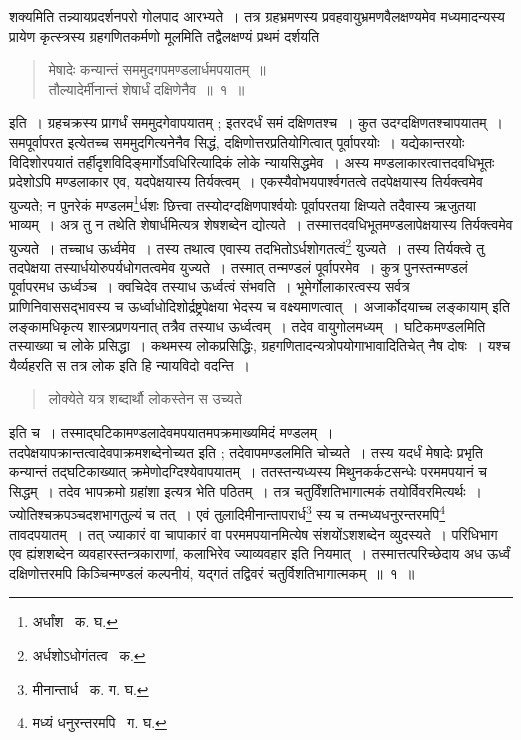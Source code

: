 \documentclass[11pt, openany]{book}
\begin{document}

\noindent शक्यमिति तन्न्यायप्रदर्शनपरो गोलपाद आरभ्यते~। तत्र ग्रहभ्रमणस्य प्रवहवायुभ्रमणवैलक्षण्यमेव मध्यमादन्यस्य प्रायेण कृत्स्त्रस्य ग्रहगणितकर्मणो मूलमिति तद्वैलक्षण्यं प्रथमं दर्शयति\textendash
\begin{quote}
{\ab मेषादेः कन्यान्तं सममुदगपमण्डलार्धमपयातम्~॥\\
तौल्यादेर्मीनान्तं शेषार्धं दक्षिणेनैव~॥~१~॥}
\end{quote}

इति~। ग्रहचक्रस्य प्रागर्धं सममुदगेवापयातम् ; इतरदर्धं समं दक्षिणतश्च~। कुत उदग्दक्षिणतश्चापयातम्~। समपूर्वापरत इत्येतच्च सममुदगित्यनेनैव सिद्धं, दक्षिणोत्तरप्रतियोगित्वात् पूर्वापरयोः~। यद्येकान्तरयोः विदिशोरपयातं तर्हीदृशविदिङ्मार्गोऽवधिरित्यादिकं लोके न्यायसिद्धमेव~। अस्य 
मण्डलाकारत्वात्तदवधिभूतः प्रदेशोऽपि मण्डलाकार एव, यदपेक्षयास्य तिर्यक्त्वम्~। एकस्यैवोभयपार्श्वगतत्वे तदपेक्षयास्य तिर्यक्त्वमेव युज्यते; न पुनरेकं मण्डलम\renewcommand{\thefootnote}{१}\footnote{अर्धांश \textendash\ क. घ.}र्धशः छित्त्वा 
तस्योदग्दक्षिणपार्श्वयोः पूर्वापरतया क्षिप्यते तदैवास्य ऋजुतया भाव्यम्~। अत्र तु न तथेति शेषार्धमित्यत्र शेषशब्देन द्योत्यते~। तस्मात्तदवधिभूतमण्डलापेक्षयास्य तिर्यक्त्वमेव युज्यते~। तच्चाध ऊर्ध्वमेव~। तस्य तथात्व एवास्य तदभितोऽर्धशोगतत्वं\renewcommand{\thefootnote}{२}\footnote{अर्धशोऽधोगंतत्व \textendash\ क.}
युज्यते~। तस्य तिर्यक्त्वे तु तदपेक्षया तस्यार्धयोरुपर्यधोगतत्वमेव युज्यते~। तस्मात् तन्मण्डलं पूर्वापरमेव~। कुत्र पुनस्तन्मण्डलं पूर्वापरमध ऊर्ध्वञ्च~। क्वचिदेव तस्याध ऊर्ध्वत्वं संभवति~। भूमेर्गोलाकारत्वस्य सर्वत्र प्राणिनिवाससद्भावस्य च ऊर्ध्वाधोदिशोर्द्रष्ट्रपेक्षया भेदस्य च
वक्ष्यमाणत्वात्~। {\qt अजार्कोदयाच्च लङ्कायाम्} इति लङ्कामधिकृत्य शास्त्रप्रणयनात् तत्रैव तस्याध ऊर्ध्वत्वम्~। तदेव वायुगोलमध्यम्~। घटिकमण्डलमिति तस्याख्या च लोके प्रसिद्धा~। कथमस्य लोकप्रसिद्धिः, ग्रहगणितादन्यत्रोपयोगाभावादितिचेत् नैष दोषः~। यश्च यैर्व्यहरति स तत्र लोक इति हि न्यायविदो वदन्ति~। 

\newpage 

\begin{quote}
{\qt लोक्येते यत्र शब्दार्थौ लोकस्तेन स उच्यते}
\end{quote} 

\indent इति च~। तस्माद्घटिकामण्डलादेवमपयातमपक्रमाख्यमिदं मण्डलम्~। तदपेक्षयापक्रान्तत्वादेवपाक्रमशब्देनोच्यत इति ; तदेवापमण्डलमिति चोच्यते~। तस्य यदर्धं मेषादेः प्रभृति कन्यान्तं तद्घटिकाख्यात् क्रमेणोदग्दिश्येवापयातम्~। ततस्तन्यध्यस्य मिथुनकर्कटसन्धेः परममपयानं च सिद्धम्~। तदेव {\qt भापक्रमो ग्रहांशा} इत्यत्र भेति पठितम्~। तत्र चतुर्विंशतिभागात्मकं तयोर्विवरमित्यर्थः~। ज्योतिश्चक्रपञ्चदशभागतुल्यं च तत्~। एवं तुलादिमीनान्तापरार्ध\renewcommand{\thefootnote}{१}\footnote{मीनान्तार्ध \textendash\ क. ग. घ.} स्य च तन्मध्यधनुरन्तरमपि\renewcommand{\thefootnote}{२}\footnote{मध्यं धनुरन्तरमपि \textendash\ ग. घ.} तावदपयातम्~। तत् ज्याकारं वा चापाकारं वा परममपयानमित्येष संशयोंऽशशब्देन व्युदस्यते~। परिधिभाग एव ह्यंशशब्देन व्यवहारस्तन्त्रकाराणां, कलाभिरेव ज्याव्यवहार इति नियमात्~। तस्मात्तत्परिच्छेदाय अध ऊर्ध्वं दक्षिणोत्तरमपि किञ्चिन्मण्डलं कल्पनीयं, यद्गतं तद्विवरं चतुर्विशतिभागात्मकम्~॥~१~॥ \\
\end{document}
